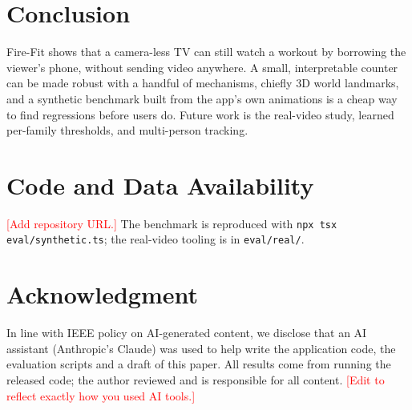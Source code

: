 \documentclass[conference]{IEEEtran}
\newcommand{\todo}[1]{\textcolor{red}{[#1]}}
\begin{document}
\section{Conclusion}
Fire-Fit shows that a camera-less TV can still watch a workout by borrowing the viewer's
phone, without sending video anywhere. A small, interpretable counter can be made
robust with a handful of mechanisms, chiefly 3D world landmarks, and a synthetic
benchmark built from the app's own animations is a cheap way to find regressions
before users do. Future work is the real-video study, learned per-family thresholds,
and multi-person tracking.

\section*{Code and Data Availability}
\todo{Add repository URL.} The benchmark is reproduced with
\texttt{npx tsx eval/synthetic.ts}; the real-video tooling is in \texttt{eval/real/}.

\section*{Acknowledgment}
In line with IEEE policy on AI-generated content, we disclose that an AI assistant
(Anthropic's Claude) was used to help write the application code, the evaluation
scripts and a draft of this paper. All results come from running the released code;
the author reviewed and is responsible for all content. \todo{Edit to reflect exactly how you used AI tools.}



\end{document}
